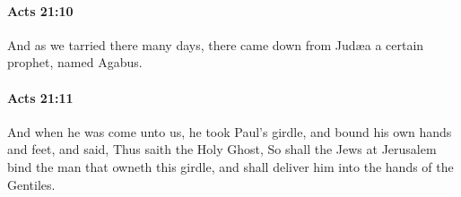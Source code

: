 		\paragraph{Acts 21:10} %
			\label{ACTS-21-10}

			And as we tarried there many days, there came down from Judæa a certain prophet, named Agabus.

			\begin{framed}
			\scriptsize
				\begin{compactdesc}
					\item[SBLG] 
				\end{compactdesc}
			\end{framed}

		\paragraph{Acts 21:11} %
			\label{ACTS-21-11}

			And when he was come unto us, he took Paul's girdle, and bound his own hands and feet, and said, Thus saith the Holy Ghost, So shall the Jews at Jerusalem bind the man that owneth this girdle, and shall deliver him into the hands of the Gentiles.

